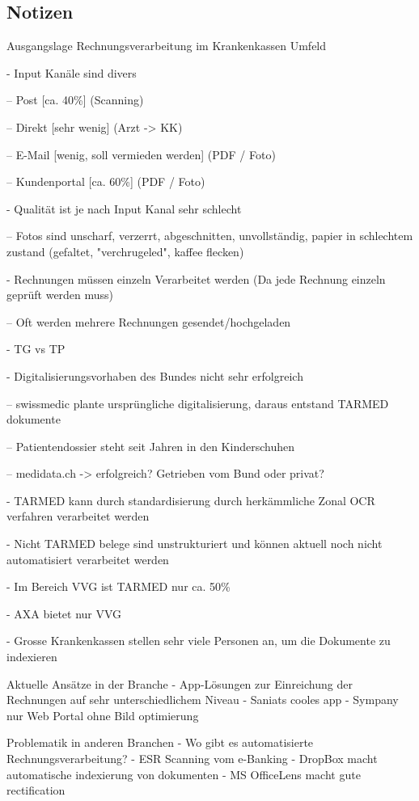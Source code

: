 \documentclass[12pt, twoside]{extarticle}
\begin{document}
\subsection{Notizen}

Ausgangslage Rechnungsverarbeitung im Krankenkassen Umfeld

- Input Kanäle sind divers

  -- Post [ca. 40\%] (Scanning)
  
  -- Direkt [sehr wenig] (Arzt -> KK)
  
  -- E-Mail [wenig, soll vermieden werden] (PDF / Foto)
  
  -- Kundenportal [ca. 60\%] (PDF / Foto)

- Qualität ist je nach Input Kanal sehr schlecht

  -- Fotos sind unscharf, verzerrt, abgeschnitten, unvollständig, papier in schlechtem zustand (gefaltet, "verchrugeled", kaffee flecken)

- Rechnungen müssen einzeln Verarbeitet werden (Da jede Rechnung einzeln geprüft werden muss)

  -- Oft werden mehrere Rechnungen gesendet/hochgeladen

- TG vs TP

- Digitalisierungsvorhaben des Bundes nicht sehr erfolgreich

  -- swissmedic plante ursprüngliche digitalisierung, daraus entstand TARMED dokumente

  -- Patientendossier steht seit Jahren in den Kinderschuhen

  -- medidata.ch -> erfolgreich? Getrieben vom Bund oder privat?

- TARMED kann durch standardisierung durch herkämmliche Zonal OCR verfahren verarbeitet werden

- Nicht TARMED belege sind unstrukturiert und können aktuell noch nicht automatisiert verarbeitet werden

- Im Bereich VVG ist TARMED nur ca. 50\%

- AXA bietet nur VVG

- Grosse Krankenkassen stellen sehr viele Personen an, um die Dokumente zu indexieren

Aktuelle Ansätze in der Branche
- App-Lösungen zur Einreichung der Rechnungen auf sehr unterschiedlichem Niveau
  - Saniats cooles app
  - Sympany nur Web Portal ohne Bild optimierung

Problematik in anderen Branchen
- Wo gibt es automatisierte Rechnungsverarbeitung?
- ESR Scanning vom e-Banking
- DropBox macht automatische indexierung von dokumenten
- MS OfficeLens macht gute rectification
\end{document}
